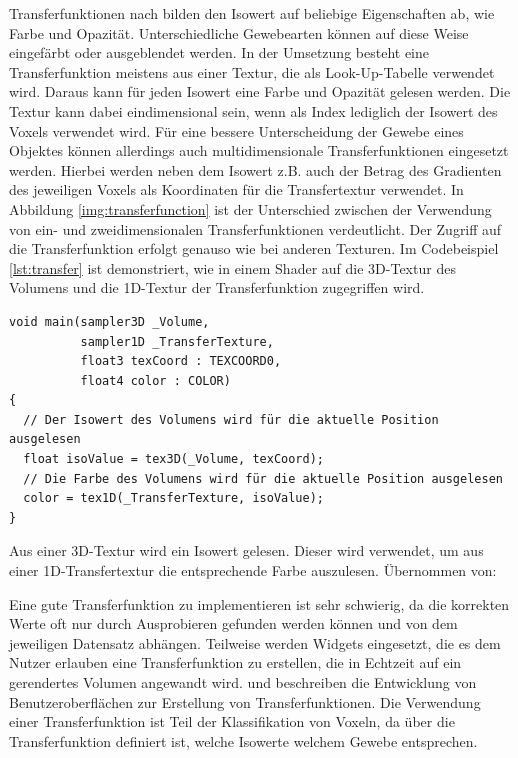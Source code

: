 Transferfunktionen nach \cite{Fernando04} bilden den Isowert auf beliebige Eigenschaften ab, wie  Farbe und Opazität.  Unterschiedliche Gewebearten können auf diese Weise eingefärbt oder ausgeblendet werden. In der Umsetzung besteht eine Transferfunktion meistens aus einer Textur, die als Look-Up-Tabelle verwendet wird. Daraus kann für jeden Isowert eine Farbe und Opazität gelesen werden. Die Textur kann dabei eindimensional sein, wenn als Index lediglich der Isowert des Voxels verwendet wird. Für eine bessere Unterscheidung der Gewebe eines Objektes können allerdings auch multidimensionale Transferfunktionen eingesetzt werden. Hierbei werden neben dem Isowert z.B. auch der Betrag des Gradienten des jeweiligen Voxels als Koordinaten für die Transfertextur verwendet. In Abbildung \ref{img:transferfunction} ist der Unterschied zwischen der Verwendung von ein- und zweidimensionalen Transferfunktionen verdeutlicht. Der Zugriff auf die Transferfunktion erfolgt genauso wie bei anderen Texturen. Im Codebeispiel \ref{lst:transfer} ist demonstriert, wie in einem Shader auf die 3D-Textur des Volumens und die 1D-Textur der Transferfunktion zugegriffen wird. 

\begin{listing}[!htb]
\begin{verbatim}
void main(sampler3D _Volume,
          sampler1D _TransferTexture,
          float3 texCoord : TEXCOORD0,
          float4 color : COLOR)
{
  // Der Isowert des Volumens wird für die aktuelle Position ausgelesen
  float isoValue = tex3D(_Volume, texCoord);
  // Die Farbe des Volumens wird für die aktuelle Position ausgelesen
  color = tex1D(_TransferTexture, isoValue);
}
\end{verbatim}
\caption{Aus einer 3D-Textur wird ein Isowert gelesen. Dieser wird verwendet, um aus einer 1D-Transfertextur die entsprechende Farbe auszulesen. Übernommen von: \cite{Fernando04}}
\label{lst:transfer}
\end{listing}
\FloatBarrier

Eine gute Transferfunktion zu implementieren ist sehr schwierig, da die korrekten Werte oft nur durch Ausprobieren gefunden werden können und von dem jeweiligen Datensatz abhängen. Teilweise werden Widgets eingesetzt, die es dem Nutzer erlauben eine Transferfunktion zu erstellen, die in Echtzeit auf ein gerendertes Volumen angewandt wird.
\cite{salama06} und \cite{Knig99} beschreiben die Entwicklung von Benutzeroberflächen zur Erstellung von Transferfunktionen.
Die Verwendung einer Transferfunktion ist Teil der Klassifikation von Voxeln, da über die Transferfunktion definiert ist, welche Isowerte welchem Gewebe entsprechen.

